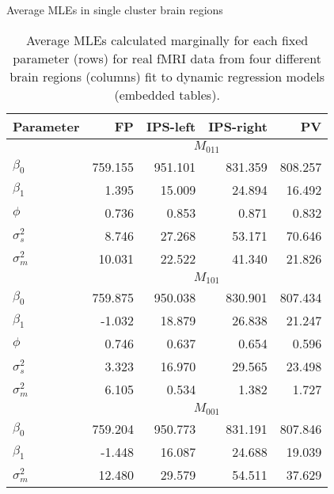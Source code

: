 \begin{table}
\ssp
\centering
\caption{Average MLEs in single cluster brain regions} \label{tab:fmri:mle:means}
\begin{tabular}{|l|rrrr|}
\hline
Parameter & FP & IPS-left & IPS-right & PV \\
\hline
 & \multicolumn{4}{|c|}{$M_{011}$} \\
\hline
$\beta_0$ & 759.155 & 951.101 & 831.359 & 808.257 \\
$\beta_1$ & 1.395 & 15.009 & 24.894 & 16.492 \\
$\phi$ & 0.736 & 0.853 & 0.871 & 0.832 \\
$\sigma^2_s$ & 8.746 & 27.268 & 53.171 & 70.646 \\
$\sigma^2_m$ & 10.031 & 22.522 & 41.340 & 21.826 \\
\hline
 & \multicolumn{4}{|c|}{$M_{101}$} \\
\hline
$\beta_0$ & 759.875 & 950.038 & 830.901 & 807.434 \\
$\beta_1$ & -1.032 & 18.879 & 26.838 & 21.247 \\
$\phi$ & 0.746 & 0.637 & 0.654 & 0.596 \\
$\sigma^2_s$ & 3.323 & 16.970 & 29.565 & 23.498 \\
$\sigma^2_m$ & 6.105 & 0.534 & 1.382 & 1.727 \\
\hline
 & \multicolumn{4}{|c|}{$M_{001}$} \\
\hline
$\beta_0$ & 759.204 & 950.773 & 831.191 & 807.846 \\
$\beta_1$ & -1.448 & 16.087 & 24.688 & 19.039 \\
$\sigma^2_m$ & 12.480 & 29.579 & 54.511 & 37.629 \\
\hline
\end{tabular}
\caption*{Average MLEs calculated marginally for each fixed parameter (rows) for real fMRI data from four different brain regions (columns) fit to dynamic regression models (embedded tables).}
\end{table}

